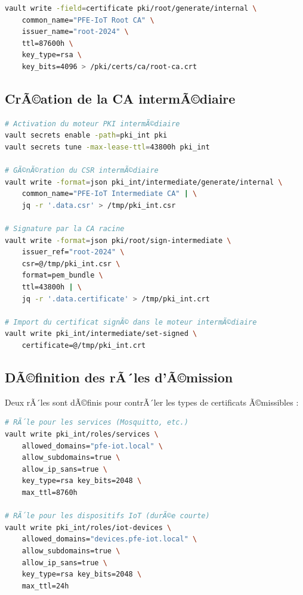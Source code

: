 \begin{lstlisting}[language=bash, caption=GÃ©nÃ©ration de la CA racine dans Vault]
vault write -field=certificate pki/root/generate/internal \
    common_name="PFE-IoT Root CA" \
    issuer_name="root-2024" \
    ttl=87600h \
    key_type=rsa \
    key_bits=4096 > /pki/certs/ca/root-ca.crt
\end{lstlisting}

\subsection{CrÃ©ation de la CA intermÃ©diaire}

\begin{lstlisting}[language=bash, caption=GÃ©nÃ©ration et signature de la CA intermÃ©diaire]
# Activation du moteur PKI intermÃ©diaire
vault secrets enable -path=pki_int pki
vault secrets tune -max-lease-ttl=43800h pki_int

# GÃ©nÃ©ration du CSR intermÃ©diaire
vault write -format=json pki_int/intermediate/generate/internal \
    common_name="PFE-IoT Intermediate CA" | \
    jq -r '.data.csr' > /tmp/pki_int.csr

# Signature par la CA racine
vault write -format=json pki/root/sign-intermediate \
    issuer_ref="root-2024" \
    csr=@/tmp/pki_int.csr \
    format=pem_bundle \
    ttl=43800h | \
    jq -r '.data.certificate' > /tmp/pki_int.crt

# Import du certificat signÃ© dans le moteur intermÃ©diaire
vault write pki_int/intermediate/set-signed \
    certificate=@/tmp/pki_int.crt
\end{lstlisting}

\subsection{DÃ©finition des rÃ´les d'Ã©mission}

Deux rÃ´les sont dÃ©finis pour contrÃ´ler les types de certificats Ã©missibles :

\begin{lstlisting}[language=bash, caption=RÃ´les Vault pour services et dispositifs IoT]
# RÃ´le pour les services (Mosquitto, etc.)
vault write pki_int/roles/services \
    allowed_domains="pfe-iot.local" \
    allow_subdomains=true \
    allow_ip_sans=true \
    key_type=rsa key_bits=2048 \
    max_ttl=8760h

# RÃ´le pour les dispositifs IoT (durÃ©e courte)
vault write pki_int/roles/iot-devices \
    allowed_domains="devices.pfe-iot.local" \
    allow_subdomains=true \
    allow_ip_sans=true \
    key_type=rsa key_bits=2048 \
    max_ttl=24h
\end{lstlisting}

